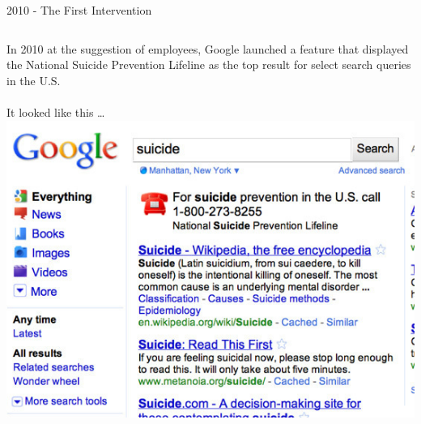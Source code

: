 \documentclass[nobackground,dvipsnames,table,aspectratio=169]{beamer}
\begin{document}
\begin{frame}{2010 - The First Intervention}
    \begin{columns}
            In 2010 at the suggestion of employees, Google launched a feature that displayed the National Suicide Prevention Lifeline as the top result for select search queries in the U.S.\\~\\
            It looked like this … 
            \includegraphics[width=\textwidth]{first-intervention}
    \end{columns}
\end{frame}
\end{document}
